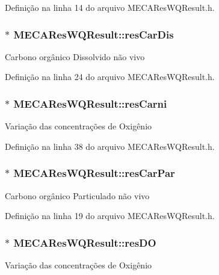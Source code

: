 Definição na linha 14 do arquivo M\+E\+C\+A\+Res\+W\+Q\+Result.\+h.

\subsubsection[{res\+Car\+Dis}]{$\ast$ M\+E\+C\+A\+Res\+W\+Q\+Result\+::res\+Car\+Dis}\label{class_m_e_c_a_res_w_q_result_aacde8ca2a528ec61100af53bce86a054}
Carbono orgânico Dissolvido não vivo 

Definição na linha 24 do arquivo M\+E\+C\+A\+Res\+W\+Q\+Result.\+h.

\subsubsection[{res\+Carni}]{$\ast$ M\+E\+C\+A\+Res\+W\+Q\+Result\+::res\+Carni}\label{class_m_e_c_a_res_w_q_result_a800f4a4c579f396d4abbaa0cd87a50a2}
Variação das concentrações de Oxigênio 

Definição na linha 38 do arquivo M\+E\+C\+A\+Res\+W\+Q\+Result.\+h.

\subsubsection[{res\+Car\+Par}]{$\ast$ M\+E\+C\+A\+Res\+W\+Q\+Result\+::res\+Car\+Par}\label{class_m_e_c_a_res_w_q_result_a0d930e48d7efee427db9ce1cc9b09a3c}
Carbono orgânico Particulado não vivo 

Definição na linha 19 do arquivo M\+E\+C\+A\+Res\+W\+Q\+Result.\+h.

\subsubsection[{res\+DO}]{$\ast$ M\+E\+C\+A\+Res\+W\+Q\+Result\+::res\+DO}\label{class_m_e_c_a_res_w_q_result_af1573dca2485932564752a2de9ea2994}
Variação das concentrações de Oxigênio 

